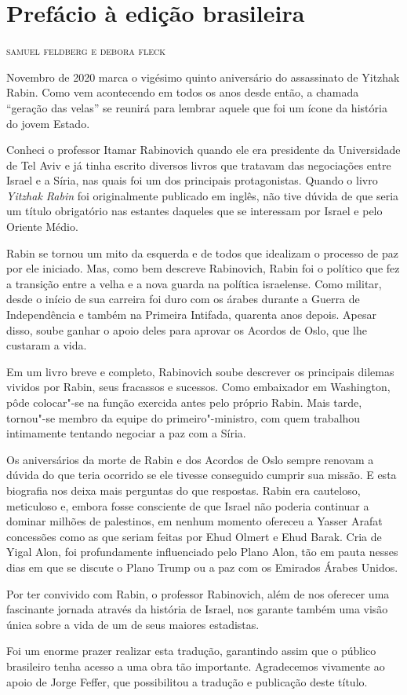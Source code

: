 \pagestyle{posf}  

\chapter*{Prefácio à edição brasileira}

\begin{flushright}
\textsc{samuel feldberg e debora fleck}
\end{flushright}

\noindent{}Novembro de 2020 marca o vigésimo quinto aniversário do assassinato de
Yitzhak Rabin. Como vem acontecendo em todos os anos desde então, a
chamada ``geração das velas'' se reunirá para lembrar aquele que foi um
ícone da história do jovem Estado.

Conheci o professor Itamar Rabinovich quando ele era presidente da
Universidade de Tel Aviv e já tinha escrito diversos livros que tratavam
das negociações entre Israel e a Síria, nas quais foi um dos principais
protagonistas. Quando o livro \textit{Yitzhak Rabin} foi originalmente publicado 
em inglês, não tive dúvida de que
seria um título obrigatório nas estantes daqueles que se interessam por
Israel e pelo Oriente Médio.

Rabin se tornou um mito da esquerda e de todos que idealizam o processo
de paz por ele iniciado. Mas, como bem descreve Rabinovich, Rabin foi o
político que fez a transição entre a velha e a nova guarda na política
israelense. Como militar, desde o início de sua carreira foi duro com os
árabes durante a Guerra de Independência e também na Primeira Intifada,
quarenta anos depois. Apesar disso, soube ganhar o apoio deles para
aprovar os Acordos de Oslo, que lhe custaram a vida.

Em um livro breve e completo, Rabinovich soube descrever os principais
dilemas vividos por Rabin, seus fracassos e sucessos. Como embaixador em
Washington, pôde colocar"-se na função exercida antes pelo próprio Rabin.
Mais tarde, tornou"-se membro da equipe do
primeiro"-ministro, com quem trabalhou intimamente tentando negociar a paz
com a Síria.

Os aniversários da morte de Rabin e dos Acordos de Oslo sempre renovam a
dúvida do que teria ocorrido se ele tivesse conseguido cumprir sua
missão. E esta biografia nos deixa mais perguntas do que respostas.
Rabin era cauteloso, meticuloso e, embora fosse consciente de que Israel não poderia continuar a dominar milhões de palestinos, em nenhum momento ofereceu a Yasser Arafat concessões como as que seriam feitas por Ehud Olmert e Ehud Barak. Cria de Yigal Alon, foi profundamente influenciado pelo Plano Alon, tão em pauta nesses dias em que se discute o Plano Trump ou a paz com os Emirados Árabes Unidos.

Por ter convivido com Rabin, o professor Rabinovich, além de nos
oferecer uma fascinante jornada através da história de Israel, nos
garante também uma visão única sobre a vida de um de seus maiores
estadistas.

Foi um enorme prazer realizar esta tradução, garantindo assim que o
público brasileiro tenha acesso a uma obra tão importante. Agradecemos vivamente ao apoio de Jorge Feffer, que possibilitou a
tradução e publicação deste título.
